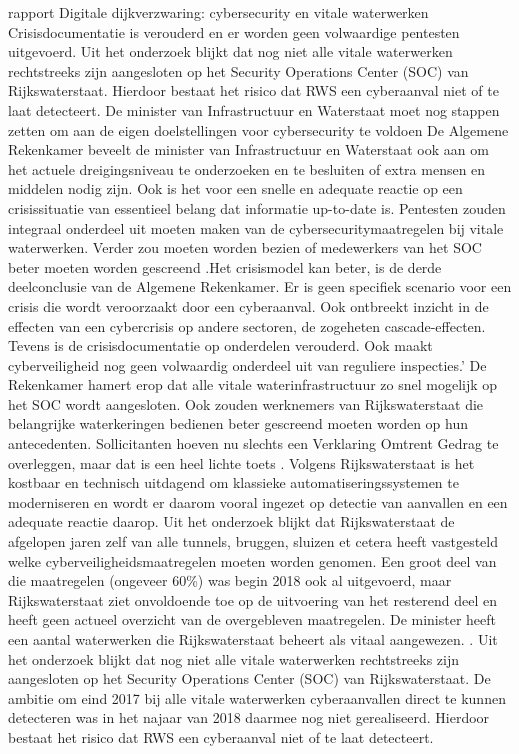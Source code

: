 \cite{hdsr30092022lichtprojectieswaterliniesluizen}
rapport Digitale dijkverzwaring: cybersecurity en vitale waterwerken 
Crisisdocumentatie is verouderd en er worden geen volwaardige pentesten uitgevoerd. Uit het onderzoek blijkt dat nog niet alle vitale waterwerken rechtstreeks zijn aangesloten op het Security Operations Center (SOC) van Rijkswaterstaat. Hierdoor bestaat het risico dat RWS een cyberaanval niet of te laat detecteert. De minister van Infrastructuur en Waterstaat moet nog stappen zetten om aan de eigen doelstellingen voor cybersecurity te voldoen
De Algemene Rekenkamer beveelt de minister van Infrastructuur en Waterstaat ook aan om het actuele dreigingsniveau te onderzoeken en te besluiten of extra mensen en middelen nodig zijn. Ook is het voor een snelle en adequate reactie op een crisissituatie van essentieel belang dat informatie up-to-date is. Pentesten zouden integraal onderdeel uit moeten maken van de cybersecuritymaatregelen bij vitale waterwerken. Verder zou moeten worden bezien of medewerkers van het SOC beter moeten worden gescreend
\cite{thkwaterwerken}.Het crisismodel kan beter, is de derde deelconclusie van de Algemene Rekenkamer. Er is geen specifiek scenario voor een crisis die wordt veroorzaakt door een cyberaanval. Ook ontbreekt inzicht in de effecten van een cybercrisis op andere sectoren, de zogeheten cascade-effecten. Tevens is de crisisdocumentatie op onderdelen verouderd\cite{rekenkamercybersecWater}.
Ook maakt cyberveiligheid nog geen volwaardig onderdeel uit van reguliere inspecties.’ De Rekenkamer hamert erop dat alle vitale waterinfrastructuur zo snel mogelijk op het SOC wordt aangesloten. Ook zouden werknemers van Rijkswaterstaat die belangrijke waterkeringen bedienen beter gescreend moeten worden op hun antecedenten. Sollicitanten hoeven nu slechts een Verklaring Omtrent Gedrag te overleggen, maar dat is een heel lichte toets
\cite{hackerWaterwerk}.
Volgens Rijkswaterstaat\cite{kramerZeeland} is het kostbaar en technisch uitdagend om klassieke automatiseringssystemen te moderniseren en wordt er daarom vooral ingezet op detectie van aanvallen en een adequate reactie daarop.
Uit het onderzoek blijkt dat Rijkswaterstaat de afgelopen jaren zelf van alle tunnels, bruggen, sluizen et cetera heeft vastgesteld welke cyberveiligheidsmaatregelen moeten worden genomen. Een groot deel van die maatregelen (ongeveer 60\%) was begin 2018 ook al uitgevoerd, maar Rijkswaterstaat ziet onvoldoende toe op de uitvoering van het resterend deel en heeft geen actueel overzicht van de overgebleven maatregelen.
De minister heeft een aantal waterwerken die Rijkswaterstaat beheert als vitaal aangewezen. . Uit het onderzoek blijkt dat nog niet alle vitale waterwerken rechtstreeks zijn aangesloten op het Security Operations Center (SOC) van Rijkswaterstaat. De ambitie om eind 2017 bij alle vitale waterwerken cyberaanvallen direct te kunnen detecteren was in het najaar van 2018 daarmee nog niet gerealiseerd. Hierdoor bestaat het risico dat RWS een cyberaanval niet of te laat detecteert\cite{cybersecWaterwerk}.
